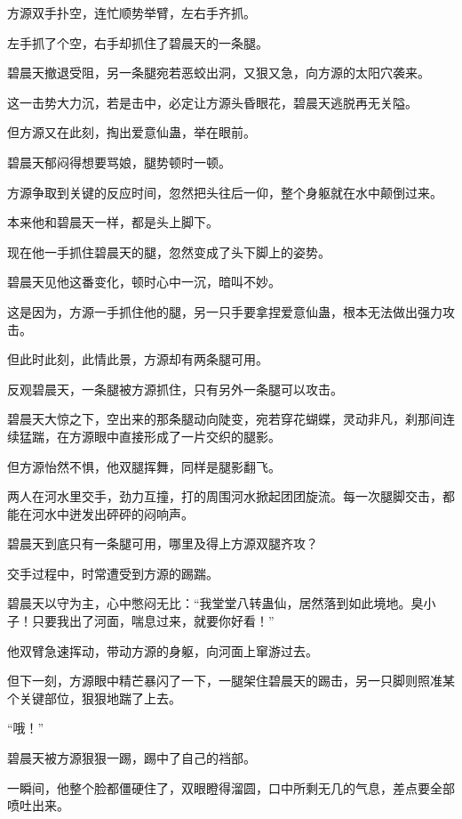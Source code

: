 
\begin{this_body}

方源双手扑空，连忙顺势举臂，左右手齐抓。

左手抓了个空，右手却抓住了碧晨天的一条腿。

碧晨天撤退受阻，另一条腿宛若恶蛟出洞，又狠又急，向方源的太阳穴袭来。

这一击势大力沉，若是击中，必定让方源头昏眼花，碧晨天逃脱再无关隘。

但方源又在此刻，掏出爱意仙蛊，举在眼前。

碧晨天郁闷得想要骂娘，腿势顿时一顿。

方源争取到关键的反应时间，忽然把头往后一仰，整个身躯就在水中颠倒过来。

本来他和碧晨天一样，都是头上脚下。

现在他一手抓住碧晨天的腿，忽然变成了头下脚上的姿势。

碧晨天见他这番变化，顿时心中一沉，暗叫不妙。

这是因为，方源一手抓住他的腿，另一只手要拿捏爱意仙蛊，根本无法做出强力攻击。

但此时此刻，此情此景，方源却有两条腿可用。

反观碧晨天，一条腿被方源抓住，只有另外一条腿可以攻击。

碧晨天大惊之下，空出来的那条腿动向陡变，宛若穿花蝴蝶，灵动非凡，刹那间连续猛踹，在方源眼中直接形成了一片交织的腿影。

但方源怡然不惧，他双腿挥舞，同样是腿影翻飞。

两人在河水里交手，劲力互撞，打的周围河水掀起团团旋流。每一次腿脚交击，都能在河水中迸发出砰砰的闷响声。

碧晨天到底只有一条腿可用，哪里及得上方源双腿齐攻？

交手过程中，时常遭受到方源的踢踹。

碧晨天以守为主，心中憋闷无比：“我堂堂八转蛊仙，居然落到如此境地。臭小子！只要我出了河面，喘息过来，就要你好看！”

他双臂急速挥动，带动方源的身躯，向河面上窜游过去。

但下一刻，方源眼中精芒暴闪了一下，一腿架住碧晨天的踢击，另一只脚则照准某个关键部位，狠狠地踹了上去。

“哦！”

碧晨天被方源狠狠一踢，踢中了自己的裆部。

一瞬间，他整个脸都僵硬住了，双眼瞪得溜圆，口中所剩无几的气息，差点要全部喷吐出来。


\end{this_body}
